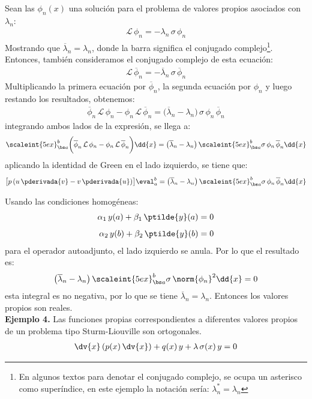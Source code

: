 Sean las $\phi_{n}(x)$ una solución para el problema de valores propios asociados con $\lambda_{n}$:
\begin{align*}
\mathcal{L} \, \phi_{n} = - \lambda_{n} \, \sigma \, \phi_{n}
\end{align*}
Mostrando que $\overline{\lambda}_{n} = \lambda_{n}$, donde la barra significa el conjugado complejo\footnote{En algunos textos para denotar el conjugado complejo, se ocupa un asterisco como superíndice, en este ejemplo la notación sería: $\lambda_{n}^{*} = \lambda_{n}$}. Entonces, también consideramos el conjugado complejo de esta ecuación:
\begin{align*}
\mathcal{L} \, \overline{\phi}_{n} = - \overline{\lambda}_{n} \, \sigma \, \overline{\phi}_{n}
\end{align*}
Multiplicando la primera ecuación por $\overline{\phi}_{n}$, la segunda ecuación por $\phi_{n}$ y luego restando los resultados, obtenemos:
\begin{align*}
\overline{\phi}_{n} \, \mathcal{L} \, \phi_{n} - \phi_{n} \, \mathcal{L} \, \overline{\phi}_{n} = \big( \overline{\lambda}_{n} - \lambda_{n} \big) \, \sigma \, \phi_{n} \, \overline{\phi}_{n}
\end{align*}
integrando ambos lados de la expresión, se llega a:
\begin{align*}
\scaleint{5ex}_{\bs a}^{b} \bigg( \overline{\phi}_{n} \, \mathcal{L} \, \phi_{n} - \phi_{n} \, \mathcal{L} \, \overline{\phi}_{n} \bigg) \dd{x} = \big( \overline{\lambda}_{n} - \lambda_{n} \big) \, \scaleint{5ex}_{\bs a}^{b} \sigma \, \phi_{n} \, \overline{\phi}_{n} \dd{x}
\end{align*}
aplicando la identidad de Green en el lado izquierdo, se tiene que:
\begin{align*}
\big[ p \, (u \, \pderivada{v} - v \, \pderivada{u}) \big]\eval_{a}^{b} = \big( \overline{\lambda}_{n} - \lambda_{n} \big) \, \scaleint{5ex}_{\bs a}^{b} \sigma \, \phi_{n} \, \overline{\phi}_{n} \dd{x}
\end{align*}

Usando las condiciones homogéneas:
\begin{align*}
\alpha_{1} \, y(a) + \beta_{1} \, \ptilde{y} (a) &= 0 \\[0.5em]
\alpha_{2} \, y(b) + \beta_{2} \, \ptilde{y} (b) &= 0
\end{align*}
para el operador autoadjunto, el lado izquierdo se anula. Por lo que el resultado es:
\begin{align*}
\big( \overline{\lambda}_{n} - \lambda_{n} \big) \, \scaleint{5ex}_{\bs a}^{b} \sigma \, \norm{\phi_{n}}^{2} \dd{x} = 0
\end{align*}
esta integral es no negativa, por lo que se tiene $\overline{\lambda}_{n} = \lambda_{n}$. Entonces los valores propios son reales.
\\
\noindent
\textbf{Ejemplo 4.} Las funciones propias correspondientes a diferentes valores propios de un problema tipo Sturm-Liouville son ortogonales.
\begin{align*}
\dv{x} \left( p(x) \, \dv{x} \right) + q(x) \, y + \lambda \, \sigma (x) \, y = 0
\end{align*}

